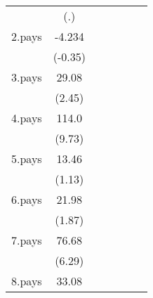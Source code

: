 {\begin{tabular}{l*{6}{c}}
                    &         (.)         &                     &                     &                     &                     &                     \\
[1em]
2.pays              &      -4.234         &                     &                     &                     &                     &                     \\
                    &     (-0.35)         &                     &                     &                     &                     &                     \\
[1em]
3.pays              &       29.08\sym{*}  &                     &                     &                     &                     &                     \\
                    &      (2.45)         &                     &                     &                     &                     &                     \\
[1em]
4.pays              &       114.0\sym{***}&                     &                     &                     &                     &                     \\
                    &      (9.73)         &                     &                     &                     &                     &                     \\
[1em]
5.pays              &       13.46         &                     &                     &                     &                     &                     \\
                    &      (1.13)         &                     &                     &                     &                     &                     \\
[1em]
6.pays              &       21.98         &                     &                     &                     &                     &                     \\
                    &      (1.87)         &                     &                     &                     &                     &                     \\
[1em]
7.pays              &       76.68\sym{***}&                     &                     &                     &                     &                     \\
                    &      (6.29)         &                     &                     &                     &                     &                     \\
[1em]
8.pays              &       33.08\sym{**} &                     &                     &                     &                     &                     \\

\end{tabular}}
